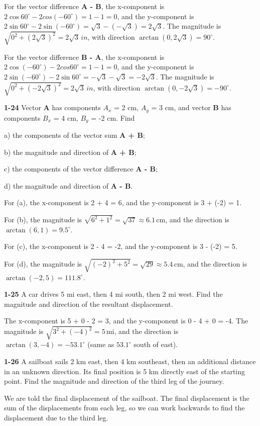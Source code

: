 \documentclass{amsart}
\begin{document}
For the vector difference \textbf{A - B}, the x-component is $2 \cos 60^\circ - 2 cos (-60^\circ) = 1 - 1 = 0$,
and the y-component is $2 \sin 60^\circ - 2 \sin (-60^\circ) = \sqrt{3} - (-\sqrt{3}) = 2\sqrt{3}$.
The magnitude is $\sqrt{0^2 + (2\sqrt{3})^2} = 2\sqrt{3}\,in$, with direction $\arctan(0, 2\sqrt{3}) = 90^\circ$.

For the vector difference \textbf{B - A}, the x-component is $2 \cos (-60^\circ) - 2 cos 60^\circ = 1 - 1 = 0$,
and the y-component is $2 \sin (-60^\circ) - 2 \sin 60^\circ = -\sqrt{3} - \sqrt{3} = -2\sqrt{3}$.
The magnitude is $\sqrt{0^2 + (-2\sqrt{3})^2} = 2\sqrt{3}\,in$, with direction $\arctan(0, -2\sqrt{3}) = -90^\circ$.

\textbf{1-24} Vector \textbf{A} has components $A_x$ = 2 cm, $A_y$ = 3 cm,
and vector \textbf{B} has components $B_x$ = 4 cm, $B_y$ = -2 cm.
Find

a) the components of the vector sum \textbf{A + B};

b) the magnitude and direction of \textbf{A + B};

c) the components of the vector difference \textbf{A - B};

d) the magnitude and direction of \textbf{A - B}.

For (a), the x-component is 2 + 4 = 6, and the y-component is 3 + (-2) = 1.

For (b), the magnitude is $\sqrt{6^2+1^2} = \sqrt{37} \approx 6.1$\,cm,
and the direction is $\arctan(6,1) = 9.5^\circ$.

For (c), the x-component is 2 - 4 = -2, and the y-component is 3 - (-2) = 5.

For (d), the magnitude is $\sqrt{(-2)^2 + 5^2} = \sqrt{29} \approx 5.4$\,cm,
and the direction is $\arctan(-2, 5) = 111.8^\circ$.

\textbf{1-25} A car drives 5 mi east, then 4 mi south, then 2 mi west.
Find the magnitude and direction of the resultant displacement.

The x-component is 5 + 0 - 2 = 3, and the y-component is 0 - 4 + 0 = -4.
The magnitude is $\sqrt{3^2+(-4)^2} = 5$\,mi, and the direction is $\arctan(3,-4) = -53.1^\circ$
(same as $53.1^\circ$ south of east).

\textbf{1-26} A sailboat sails 2 km east, then 4 km southeast, then an additional distance in an unknown direction.
Its final position is 5 km directly east of the starting point.
Find the magnitude and direction of the third leg of the journey.

We are told the final displacement of the sailboat.
The final displacement is the sum of the displacements from each leg,
so we can work backwards to find the displacement due to the third leg.
\end{document}
